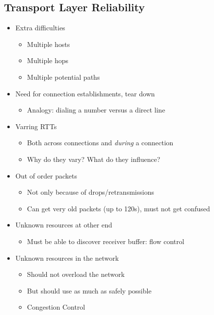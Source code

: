 \subsection{Transport Layer Reliability}
\begin{itemize}[nosep]
    \item Extra difficulties
          \begin{itemize}[nosep]
              \item Multiple hosts
              \item Multiple hops
              \item Multiple potential paths
          \end{itemize}
    \item Need for connection establishments, tear down
          \begin{itemize}[nosep]
              \item Analogy: dialing a number versus a direct line
          \end{itemize}
    \item Varring RTTs
          \begin{itemize}[nosep]
              \item Both across connections and \emph{during} a connection
              \item Why do they vary? What do they influence?
          \end{itemize}
    \item Out of order packets
          \begin{itemize}
              \item Not only because of drops/retransmissions
              \item Can get very old packets (up to 120s), must not get confused
          \end{itemize}
    \item Unknown resources at other end
          \begin{itemize}[nosep]
              \item Must be able to discover receiver buffer: flow control
          \end{itemize}
    \item Unknown resources in the network
          \begin{itemize}[nosep]
              \item Should not overload the network
              \item But should use as much as safely possible
              \item Congestion Control
          \end{itemize}
\end{itemize}
